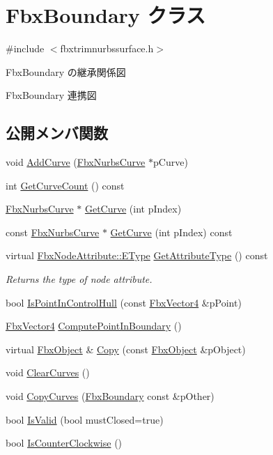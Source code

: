 \hypertarget{class_fbx_boundary}{}\section{Fbx\+Boundary クラス}
\label{class_fbx_boundary}


{\ttfamily \#include $<$fbxtrimnurbssurface.\+h$>$}



Fbx\+Boundary の継承関係図


Fbx\+Boundary 連携図
\subsection*{公開メンバ関数}
\begin{DoxyCompactItemize}
\item 
void \hyperlink{class_fbx_boundary_af94f173acd55d7d5f285f8539bbb48e4}{Add\+Curve} (\hyperlink{class_fbx_nurbs_curve}{Fbx\+Nurbs\+Curve} $\ast$p\+Curve)
\item 
int \hyperlink{class_fbx_boundary_adcd0d41aa9a5804cd74ed14b6b8f6f8a}{Get\+Curve\+Count} () const
\item 
\hyperlink{class_fbx_nurbs_curve}{Fbx\+Nurbs\+Curve} $\ast$ \hyperlink{class_fbx_boundary_acbf7b338d8b90d6cd52e7c39faa8b648}{Get\+Curve} (int p\+Index)
\item 
const \hyperlink{class_fbx_nurbs_curve}{Fbx\+Nurbs\+Curve} $\ast$ \hyperlink{class_fbx_boundary_a1f9aac3b37beac6639afa97c79e45358}{Get\+Curve} (int p\+Index) const
\item 
virtual \hyperlink{class_fbx_node_attribute_a08e1669d3d1a696910756ab17de56d6a}{Fbx\+Node\+Attribute\+::\+E\+Type} \hyperlink{class_fbx_boundary_a093be9c6c0c0f13a337e9b6815aed9d0}{Get\+Attribute\+Type} () const
\begin{DoxyCompactList}\small\item\em Returns the type of node attribute. \end{DoxyCompactList}\item 
bool \hyperlink{class_fbx_boundary_ad319a0f4511c35710c24b543d30bbee2}{Is\+Point\+In\+Control\+Hull} (const \hyperlink{class_fbx_vector4}{Fbx\+Vector4} \&p\+Point)
\item 
\hyperlink{class_fbx_vector4}{Fbx\+Vector4} \hyperlink{class_fbx_boundary_a615c36267401342800e00befefa50f6c}{Compute\+Point\+In\+Boundary} ()
\item 
virtual \hyperlink{class_fbx_object}{Fbx\+Object} \& \hyperlink{class_fbx_boundary_a6fe59f45c17eeebbabaeff235058ac70}{Copy} (const \hyperlink{class_fbx_object}{Fbx\+Object} \&p\+Object)
\item 
void \hyperlink{class_fbx_boundary_aa1c12f34cb325c5a337fa383f0860e06}{Clear\+Curves} ()
\item 
void \hyperlink{class_fbx_boundary_ae41addb147733da9216a785bc6d003c3}{Copy\+Curves} (\hyperlink{class_fbx_boundary}{Fbx\+Boundary} const \&p\+Other)
\item 
bool \hyperlink{class_fbx_boundary_a4ecaec2f4194b5ba045c14ec0549d10e}{Is\+Valid} (bool must\+Closed=true)
\item 
bool \hyperlink{class_fbx_boundary_a025f682e72db299620e30eeeebdd1ea7}{Is\+Counter\+Clockwise} ()
\end{DoxyCompactItemize}
